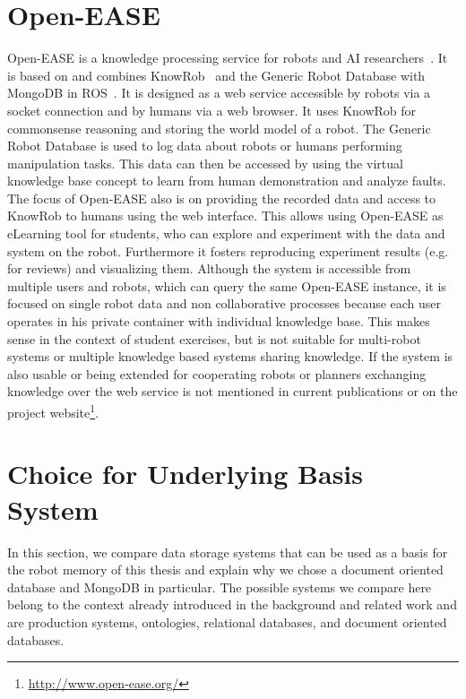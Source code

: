 \section{Open-EASE}
\label{sec:openease}
Open-EASE is a knowledge processing service for robots and AI
researchers~\cite{OpenEASE}. It is based on and combines
KnowRob~\cite{KnowRob} and the Generic Robot Database with MongoDB in
ROS~\cite{RoboDB}. It is designed as a web service accessible by
robots via a socket connection and by humans via a web browser. It
uses KnowRob for commonsense reasoning and storing the world model of
a robot. The Generic Robot Database is used to log data about robots
or humans performing manipulation tasks. This data can then be
accessed by using the virtual knowledge base concept to learn from
human demonstration and analyze faults. The focus of Open-EASE also is
on providing the recorded data and access to KnowRob to humans using
the web interface. This allows using Open-EASE as eLearning tool for
students, who can explore and experiment with the data and system on
the robot. Furthermore it fosters reproducing experiment results
(e.g. for reviews) and visualizing them. Although the system is
accessible from multiple users and robots, which can query the same
Open-EASE instance, it is focused on single robot data and non
collaborative processes because each user operates in his private
container with individual knowledge base. This makes sense in the
context of student exercises, but is not suitable for multi-robot
systems or multiple knowledge based systems sharing knowledge. If the
system is also usable or being extended for cooperating robots or
planners exchanging knowledge over the web service is not mentioned in
current publications or on the project
website\footnote{\url{http://www.open-ease.org/}}.

\section{Choice for Underlying Basis System}
\label{sec:basis-representation}
In this section, we compare data storage systems that can be used as a
basis for the robot memory of this thesis and explain why we chose a
document oriented database and MongoDB in particular. The possible
systems we compare here belong to the context already introduced in
the background and related work and are production systems,
ontologies, relational databases, and document oriented databases.

